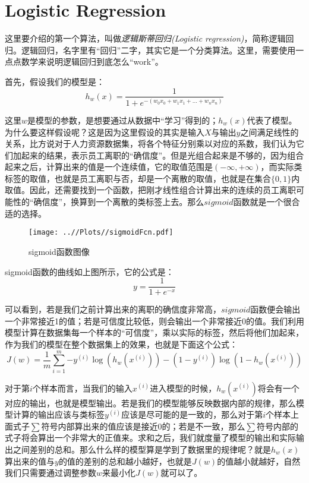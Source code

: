 \documentclass[UTF8, 12pt]{ctexart}
\begin{document}
\section{Logistic Regression}
这里要介绍的第一个算法，叫做\emph{逻辑斯蒂回归(Logistic regression)}，简称逻辑回归。逻辑回归，名字里有“回归”二字，其实它是一个分类算法。这里，需要使用一点点数学来说明逻辑回归到底怎么“work”。

首先，假设我们的模型是：
\begin{equation}
	h_{w}(x) = \frac{1}{1+e^{-(w_{0}x_{0}+w_{1}x_{1}+...+w_{n}x_{n})}}
\end{equation}

这里$w$是模型的参数，是想要通过从数据中“学习”得到的；$h_{w}(x)$代表了模型。为什么要这样假设呢？这是因为这里假设的其实是输入$X$与输出$y$之间满足线性的关系，比方说对于人力资源数据集，将各个特征分别乘以对应的系数，我们认为它们加起来的结果，表示员工离职的“确信度”。但是光组合起来是不够的，因为组合起来之后，计算出来的值是一个连续值，它的取值范围是$(-\infty, +\infty)$，而实际类标签的取值，也就是员工离职与否，却是一个离散的取值，也就是在集合$\{0, 1\}$内取值。因此，还需要找到一个函数，把刚才线性组合计算出来的连续的员工离职可能性的“确信度”，换算到一个离散的类标签上去。那么$sigmoid$函数就是一个很合适的选择。
\begin{figure}[H]
	\centering
	\texttt{[image: ..//Plots//sigmoidFcn.pdf]}
	\caption{sigmoid函数图像}
	\label{Fig:3}
	\vspace{-0.5em}
\end{figure}

sigmoid函数的曲线如上图所示，它的公式是：
\begin{equation}
	y = \frac{1}{1+e^{-x}}
\end{equation}

可以看到，若是我们之前计算出来的离职的确信度非常高，$sigmoid$函数便会输出一个非常接近1的值；若是可信度比较低，则会输出一个非常接近0的值。我们利用模型计算在数据集每一个样本的“可信度”，乘以实际的标签，然后将他们加起来，作为我们的模型在整个数据集上的效果\cite{ng2000cs229}，也就是下面这个公式：
\begin{equation}
	J(w) = \frac{1}{m} \sum_{i=1}^{m} { -y^{(i)}\log(h_{w}(x^{(i)})) - (1-y^{(i)})\log(1-h_{w}(x^{(i)})) }
\end{equation}

对于第$i$个样本而言，当我们的输入$x^{(i)}$进入模型的时候，$h_{w}(x^{(i)})$将会有一个对应的输出，也就是模型输出。若是我们的模型能够反映数据内部的规律，那么模型计算的输出应该与类标签$y^{(i)}$应该是尽可能的是一致的，那么对于第$i$个样本上面式子$\sum$符号内部算出来的值应该是接近0的；若是不一致，那么$\sum$符号内部的式子将会算出一个非常大的正值来。求和之后，我们就度量了模型的输出和实际输出之间差别的总和。那么什么样的模型算是学到了数据里的规律呢？就是$h_{w}(x)$算出来的值与$y$的值的差别的总和越小越好，也就是$J(w)$的值越小就越好，自然我们只需要通过调整参数$w$来最小化$J(w)$就可以了。
\end{document}
